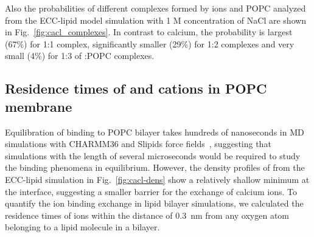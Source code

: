 \documentclass[aip,jcp,twocolumn]{revtex4}
\begin{document}
Also the probabilities of different complexes formed by  ions and POPC
analyzed from the ECC-lipid model simulation with 1 M concentration of NaCl are
shown in Fig.~\ref{fig:cacl_complexes}. In contrast to calcium, the
probability is largest (67\%) for 1:1 complex, significantly smaller (29\%)
for 1:2 complexes and very small (4\%) for 1:3 of :POPC complexes.




\subsection{Residence times of  and  cations in POPC membrane}

Equilibration of  binding to POPC bilayer takes hundreds of
nanoseconds in MD simulations with CHARMM36 and Slipids force fields~\cite{javanainen17}, suggesting that
simulations with the length of several microseconds would be required
to study the binding phenomena in equilibrium. However, the density profiles of 
from the ECC-lipid simulation in Fig.~\ref{fig:cacl-dens} show a relatively shallow
minimum at the interface, suggesting a smaller barrier for the exchange of calcium ions.
To quantify the ion binding exchange in lipid bilayer simulations, we calculated 
the residence times of ions within the distance of 0.3~nm from any oxygen atom
belonging to a lipid molecule in a bilayer.
\end{document}
